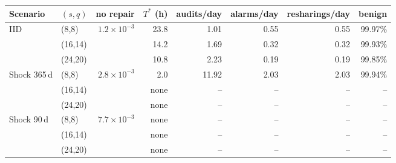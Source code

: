 \begin{tabular}{@{}llrrrrrr@{}}
\toprule
Scenario & $(s,q)$ & no repair & $T^{*}$ (h) & audits/day & alarms/day & resharings/day & benign\\
\midrule
IID & (8,8) & $1.2{\times}10^{-3}$ & 23.8 & 1.01 & 0.55 & 0.55 & 99.97\%\\
 & (16,14) &  & 14.2 & 1.69 & 0.32 & 0.32 & 99.93\%\\
 & (24,20) &  & 10.8 & 2.23 & 0.19 & 0.19 & 99.85\%\\
Shock 365\,d & (8,8) & $2.8{\times}10^{-3}$ & 2.0 & 11.92 & 2.03 & 2.03 & 99.94\%\\
 & (16,14) &  & none & -- & -- & -- & --\\
 & (24,20) &  & none & -- & -- & -- & --\\
Shock 90\,d & (8,8) & $7.7{\times}10^{-3}$ & none & -- & -- & -- & --\\
 & (16,14) &  & none & -- & -- & -- & --\\
 & (24,20) &  & none & -- & -- & -- & --\\
\bottomrule
\end{tabular}

